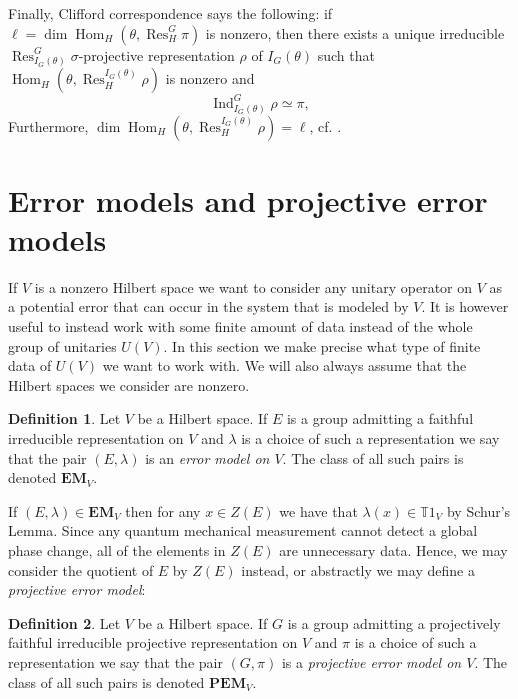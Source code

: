 \documentclass[11pt, oneside, reqno]{amsart}
\newcommand{\bbT}{\mathbb{T}}
\newcommand{\EM}{\mathbf{EM}}
\newcommand{\PEM}{\mathbf{PEM}}
\newcommand{\Hom}{\operatorname{Hom}}
\newcommand{\Res}{\operatorname{Res}}
\newcommand{\Ind}{\operatorname{Ind}}
\theoremstyle{definition}
\newtheorem{definition}{Definition}[section]
\theoremstyle{plain}
\theoremstyle{remark}
\begin{document}
Finally, Clifford correspondence says the following: if $\ell = \dim\Hom_H(\theta,\Res^G_H\pi)$ is nonzero, then there exists a unique irreducible $\Res^G_{I_G(\theta)}\sigma$-projective representation $\rho$ of $I_G(\theta)$ such that $\Hom_H(\theta,\Res^{I_G(\theta)}_H\rho)$ is nonzero and
\begin{equation*}
    \Ind_{I_G(\theta)}^G\rho \simeq \pi,
\end{equation*}
Furthermore, $\dim\Hom_H(\theta,\Res^{I_G(\theta)}_H\rho) = \ell$, cf. \cite[Theorem 9.12]{CeccheriniSilbersteinTullio22}.

\section{Error models and projective error models}\label{sec:EMs and PEMs}

If $V$ is a nonzero Hilbert space we want to consider any unitary operator on $V$ as a potential error that can occur in the system that is modeled by $V$. It is however useful to instead work with some finite amount of data instead of the whole group of unitaries $U(V)$. In this section we make precise what type of finite data of $U(V)$ we want to work with. We will also always assume that the Hilbert spaces we consider are nonzero.

\begin{definition}\label{def:error model}
    Let $V$ be a Hilbert space. If $E$ is a group admitting a faithful irreducible representation on $V$ and $\lambda$ is a choice of such a representation we say that the pair $(E,\lambda)$ is an \emph{error model on $V$}. The class of all such pairs is denoted $\EM_V$.
\end{definition}

If $(E,\lambda) \in \EM_V$ then for any $x \in Z(E)$ we have that $\lambda(x) \in \bbT 1_V$ by Schur's Lemma. Since any quantum mechanical measurement cannot detect a global phase change, all of the elements in $Z(E)$ are unnecessary data. Hence, we may consider the quotient of $E$ by $Z(E)$ instead, or abstractly we may define a \emph{projective error model}:

\begin{definition}\label{def:projective error model}
    Let $V$ be a Hilbert space. If $G$ is a group admitting a projectively faithful irreducible projective representation on $V$ and $\pi$ is a choice of such a representation we say that the pair $(G,\pi)$ is a \emph{projective error model on $V$}. The class of all such pairs is denoted $\PEM_V$.
\end{definition}
\end{document}
